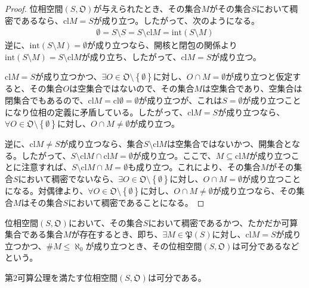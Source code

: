 \documentclass[dvipdfmx]{jsarticle}
\begin{document}
\begin{proof}
位相空間$\left( S,\mathfrak{O} \right)$が与えられたとき、その集合$M$がその集合$S$において稠密であるなら、${\mathrm{cl}}M = S$が成り立つ。したがって、次のようになる。
\begin{align*}
\emptyset = S \setminus S = S \setminus {\mathrm{cl}}M = {\mathrm{int}}(S \setminus M)
\end{align*}
逆に、${\mathrm{int}}(S \setminus M) = \emptyset$が成り立つなら、開核と閉包の関係より${\mathrm{int}}(S \setminus M) = S \setminus {\mathrm{cl}}M$が成り立ち、したがって、${\mathrm{cl}}M = S$が成り立つ。\par
${\mathrm{cl}}M = S$が成り立つかつ、$\exists O \in \mathfrak{O \setminus}\left\{ \emptyset \right\}$に対し、$O \cap M = \emptyset$が成り立つと仮定すると、その集合$O$は空集合ではないので、その集合$M$は空集合であり、空集合は閉集合でもあるので、${\mathrm{cl}}M = {\mathrm{cl}}\emptyset = \emptyset$が成り立つが、これは$S = \emptyset$が成り立つことになり位相の定義に矛盾している。したがって、${\mathrm{cl}}M = S$が成り立つなら、$\forall O \in \mathfrak{O \setminus}\left\{ \emptyset \right\}$に対し、$O \cap M \neq \emptyset$が成り立つ。\par
逆に、${\mathrm{cl}}M \neq S$が成り立つなら、集合$S \setminus {\mathrm{cl}}M$は空集合ではないかつ、開集合となる。したがって、$S \setminus {\mathrm{cl}}M \cap {\mathrm{cl}}M = \emptyset$が成り立つ。ここで、$M \subseteq {\mathrm{cl}}M$が成り立つことに注意すれば、$S \setminus {\mathrm{cl}}M \cap M = \emptyset$も成り立つ。これにより、その集合$M$がその集合$S$において稠密でないなら、$\exists O \in \mathfrak{O \setminus}\left\{ \emptyset \right\}$に対し、$O \cap M = \emptyset$が成り立つことになる。対偶律より、$\forall O \in \mathfrak{O \setminus}\left\{ \emptyset \right\}$に対し、$O \cap M \neq \emptyset$が成り立つなら、その集合$M$はその集合$S$において稠密であることになる。
\end{proof}
\begin{dfn}
位相空間$\left( S,\mathfrak{O} \right)$において、その集合$S$において稠密であるかつ、たかだか可算集合である集合$M$が存在するとき、即ち、$\exists M \in \mathfrak{P}(S)$に対し、${\mathrm{cl}}M = S$が成り立つかつ、${\#}M \leq \aleph_{0}$が成り立つとき、その位相空間$\left( S,\mathfrak{O} \right)$は可分であるなどという。
\end{dfn}
\begin{thm}\label{8.1.2.20}
第2可算公理を満たす位相空間$\left( S,\mathfrak{O} \right)$は可分である。
\end{thm}
\end{document}
